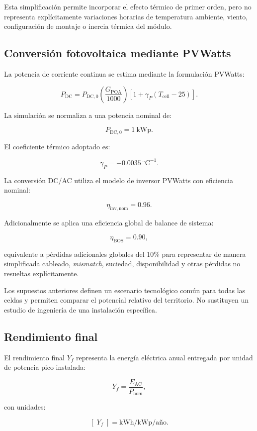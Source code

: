 \documentclass[11pt,a4paper]{article}
\begin{document}
Esta simplificación permite incorporar el efecto térmico de primer orden, pero no representa explícitamente variaciones horarias de temperatura ambiente, viento, configuración de montaje o inercia térmica del módulo.

\subsection{Conversión fotovoltaica mediante PVWatts}

La potencia de corriente continua se estima mediante la formulación PVWatts:

\[
P_{\mathrm{DC}}
=
P_{\mathrm{DC,0}}
\left(
\frac{G_{\mathrm{POA}}}{1000}
\right)
\left[
1+\gamma_P(T_{\mathrm{cell}}-25)
\right].
\]

La simulación se normaliza a una potencia nominal de:

\[
P_{\mathrm{DC,0}}=1~\mathrm{kWp}.
\]

El coeficiente térmico adoptado es:

\[
\gamma_P=-0.0035~^\circ\mathrm{C}^{-1}.
\]

La conversión DC/AC utiliza el modelo de inversor PVWatts con eficiencia nominal:

\[
\eta_{\mathrm{inv,nom}}=0.96.
\]

Adicionalmente se aplica una eficiencia global de balance de sistema:

\[
\eta_{\mathrm{BOS}}=0.90,
\]

equivalente a pérdidas adicionales globales del 10\% para representar de manera simplificada cableado, \textit{mismatch}, suciedad, disponibilidad y otras pérdidas no resueltas explícitamente.

Los supuestos anteriores definen un escenario tecnológico común para todas las celdas y permiten comparar el potencial relativo del territorio. No sustituyen un estudio de ingeniería de una instalación específica.

\subsection{Rendimiento final}

El rendimiento final $Y_f$ representa la energía eléctrica anual entregada por unidad de potencia pico instalada:

\[
Y_f
=
\frac{E_{\mathrm{AC}}}{P_{\mathrm{nom}}},
\]

con unidades:

\[
[\;Y_f\;]
=
\text{kWh/kWp/año}.
\]
\end{document}
